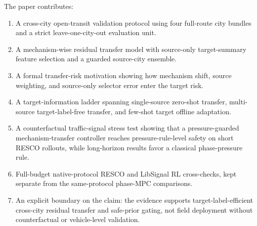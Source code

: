 The paper contributes:
\begin{enumerate}[leftmargin=1.5em]
    \item A cross-city open-transit validation protocol using four full-route city bundles and a strict leave-one-city-out evaluation unit.
    \item A mechanism-wise residual transfer model with source-only target-summary feature selection and a guarded source-city ensemble.
    \item A formal transfer-risk motivation showing how mechanism shift, source weighting, and source-only selector error enter the target risk.
    \item A target-information ladder spanning single-source zero-shot transfer, multi-source target-label-free transfer, and few-shot target offline adaptation.
    \item A counterfactual traffic-signal stress test showing that a pressure-guarded mechanism-transfer controller reaches pressure-rule-level safety on short RESCO rollouts, while long-horizon results favor a classical phase-pressure rule.
    \item Full-budget native-protocol RESCO and LibSignal RL cross-checks, kept separate from the same-protocol \ours phase-MPC comparisons.
    \item An explicit boundary on the claim: the evidence supports target-label-efficient cross-city residual transfer and safe-prior gating, not field deployment without counterfactual or vehicle-level validation.
\end{enumerate}
